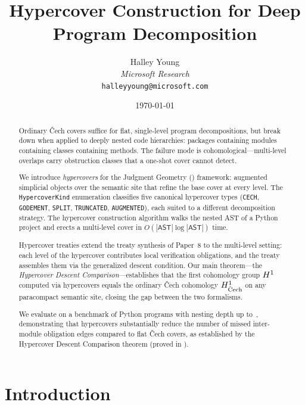 \documentclass[11pt]{article}
\title{\textbf{Hypercover Construction for Deep Program Decomposition}}
\author{%
  Halley Young\\
  \textit{Microsoft Research}\\
  \texttt{halleyyoung@microsoft.com}
}
\date{\today}
\newcommand{\AST}{\mathsf{AST}}           %
\newcommand{\KindCech}{\texttt{CECH}}
\newcommand{\KindGod}{\texttt{GODEMENT}}
\newcommand{\KindSplit}{\texttt{SPLIT}}
\newcommand{\KindTrunc}{\texttt{TRUNCATED}}
\newcommand{\KindAug}{\texttt{AUGMENTED}}
\begin{document}
\maketitle

\begin{abstract}
Ordinary Čech covers suffice for flat, single-level program decompositions,
but break down when applied to deeply nested code hierarchies: packages
containing modules containing classes containing methods.  The failure mode
is cohomological---multi-level overlaps carry obstruction classes that a
one-shot cover cannot detect.

We introduce \emph{hypercovers} for the Judgment Geometry (\JuGeo{})
framework: augmented simplicial objects over the semantic site that refine
the base cover at every level.  The \texttt{HypercoverKind} enumeration
classifies five canonical hypercover types (\KindCech{}, \KindGod{},
\KindSplit{}, \KindTrunc{}, \KindAug{}), each suited to a different
decomposition strategy.  The hypercover construction algorithm walks the
nested AST of a Python project and erects a multi-level cover in
$O(|\AST|\log|\AST|)$ time.

Hypercover treaties extend the treaty synthesis of Paper~8 to the
multi-level setting: each level of the hypercover contributes local
verification obligations, and the treaty assembles them via the
generalized descent condition.  Our main theorem---the
\emph{Hypercover Descent Comparison}---establishes that the first
cohomology group $H^{1}$ computed via hypercovers equals the
ordinary Čech cohomology $H^{1}_{\mathrm{\check{C}ech}}$ on any
paracompact semantic site, closing the gap between the two formalisms.

We evaluate on a benchmark of \ppFortyThreeTotalPrograms{} Python programs with nesting depth up
to~\ppFortyThreeMaxDepth{}, demonstrating that hypercovers substantially reduce the number of missed
inter-module obligation edges compared to flat Čech covers,
as established by the Hypercover Descent Comparison theorem (proved in \LEAN{}).
\end{abstract}

\newpage

\section{Introduction}\label{sec:intro}
\end{document}
